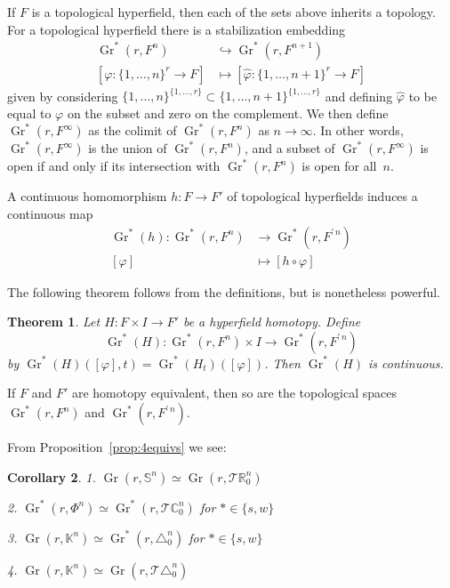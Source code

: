 \documentclass[10pt, preprint]{article}
\newtheorem{theorem}{Theorem}[section]
\newtheorem{corollary}[theorem]{Corollary}
\theoremstyle{definition}
\begin{document}
If $F$ is a topological hyperfield, then each of the sets above inherits
a topology. For a topological hyperfield there is a stabilization
embedding
%
\begin{align*}
\operatorname{Gr}^{*}(r,F^{n})
& \hookrightarrow \operatorname{Gr}
^{*}(r,F^{n+1})
\\
[\varphi : \{1, \dots , n\}^{r} \to F]
& \mapsto [{\widehat{\varphi }}:
\{1, \dots , n+1\}^{r} \to F]
\end{align*}
%
given by considering $\{1, \dots , n\}^{\{1, \dots , r\}}\subset \{1,
\dots , n+1\}^{\{1, \dots , r\}}$ and defining ${\widehat{\varphi }}$
to be equal to $\varphi $ on the subset and zero on the complement. We
then define $\operatorname{Gr}^{*}(r,F^{\infty })$ as the colimit of
$\operatorname{Gr}^{*}(r,F^{n})$ as $n \to \infty $. In other words,
$\operatorname{Gr}^{*}(r,F^{\infty })$ is the union of $
\operatorname{Gr}^{*}(r,F^{n})$, and a subset of $\operatorname{Gr}
^{*}(r,F^{\infty })$ is open if and only if its intersection with
$\operatorname{Gr}^{*}(r,F^{n})$ is open for all~$n$.

A continuous homomorphism $h : F \to F'$ of topological hyperfields
induces a continuous map
%
\begin{align*}
\operatorname{Gr}^{*}(h) : \operatorname{Gr}^{*}(r,F^{n})
&\to
\operatorname{Gr}^{*}(r,F^{\prime \,n})
\\
[\varphi ]
& \mapsto [h \circ \varphi ]
\end{align*}

The following theorem follows from the definitions, but is nonetheless
powerful.

\begin{theorem}
\label{thm:grassmann}
Let $H : F \times I \to F'$ be a hyperfield homotopy. Define
%
\begin{equation*}
\operatorname{Gr}^{*}(H) : \operatorname{Gr}^{*}(r,F^{n}) \times I
\to \operatorname{Gr}^{*}(r,F^{\prime \,n})
\end{equation*}
%
by $\operatorname{Gr}^{*}(H)([\varphi ],t) = \operatorname{Gr}^{*}(H
_{t})([\varphi ])$. Then $\operatorname{Gr}^{*}(H)$ is continuous.
\end{theorem}

If $F$ and $F'$ are homotopy equivalent, then so are the topological
spaces $\operatorname{Gr}^{*}(r,F^{n})$ and
$\operatorname{Gr}^{*}(r,F^{\prime \,n})$.

From Proposition~\ref{prop:4equivs} we see:
%
\begin{corollary}
\label{cor:grassmannhomotopy}
1. $\operatorname{Gr}(r,\mathbb{S}^{n}) \simeq \operatorname{Gr}(r,
\mathcal{T }\mathbb{R}_{0}^{n})$

2. $\operatorname{Gr}^{*}(r, \Phi ^{n})\simeq \operatorname{Gr}^{*}(r,
\mathcal{T }\mathbb{C}_{0}^{n})$ for $*\in \{s,w\}$

3. $\operatorname{Gr}(r, \mathbb{K}^{n})\simeq \operatorname{Gr}^{*}(r,
\triangle _{0}^{n})$ for $*\in \{s,w\}$

4. $\operatorname{Gr}(r, \mathbb{K}^{n})\simeq \operatorname{Gr}(r,
\mathcal{T }\triangle _{0}^{n})$
\end{corollary}
\end{document}
